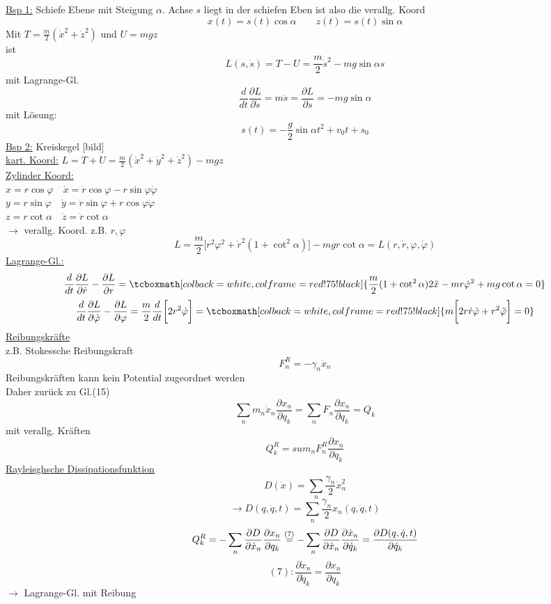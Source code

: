 \documentclass[titlepage,12pt,a4paper,ngerman]{report}
\newcommand{\rmbox}[1]{\tcboxmath[colback=white,colframe=red!75!black]{#1}} %
\renewcommand{\boxed}{\rmbox}
\begin{document}
\underline{Bsp 1:} Schiefe Ebene mit Steigung $ \alpha $. Achse $ s $ liegt in der schiefen Eben ist also die verallg. Koord
$$ x(t) = s(t) \cos \alpha \qquad z(t) = s(t) \sin \alpha$$
Mit $ T = \frac{m}{2} (\dot{x}^2 + \dot{z}^2) $ und $ U = mgz $\\
ist $$ L(s,\dot{s}) = T-U = \frac{m}{2} \dot{s}^2 - mg \sin \alpha s $$
mit Lagrange-Gl. 
$$\frac{d}{dt} \frac{\partial L}{\partial \dot{s}} = m \ddot{s} = \frac{\partial L}{\partial s} = - mg \sin \alpha$$
mit Lösung:
$$ s(t) = -\frac{g}{2} \sin \alpha t^2 + v_0 t + s_0 $$
\underline{Bsp 2:} Kreiskegel [bild]\\
\underline{kart. Koord:} $ L = T+U = \frac{m}{2} (\dot{x}^2 + \dot{y}^2 + \dot{z}^2) - mgz $\\
\underline{Zylinder Koord:}\\
$ x = r \cos \varphi \quad \dot{x} = \dot{r} \cos \varphi - r \sin \varphi \dot{\varphi} $ \\
$ y = r \sin \varphi \quad \dot{y} = \dot{r} \sin \varphi + r \cos \varphi \dot{\varphi} $\\
$z = r \cot \alpha \quad \dot{z} = \dot{r} \cot \alpha $\\
$ \rightarrow $ verallg. Koord. z.B. $ r,\varphi $\\
$$L = \frac{m}{2} \bigg[r^2 \varphi^2 + \dot{r}^2 ( 1 + \cot ^2 \alpha)\bigg] - mg r \cot \alpha = L(r,\dot{r}, \varphi , \dot{\varphi})$$
\underline{Lagrange-Gl.:}
$$\frac{d}{dt} \frac{\partial L}{\partial \dot{r}} - \frac{\partial L}{\partial r} = \boxed{\frac{m}{2} (1 + \cot^2 \alpha) 2 \ddot{x} - m r \dot{\varphi}^2 + m g \cot \alpha = 0}$$
$$ \frac{d}{dt} \frac{\partial L}{\partial \dot{\varphi}} - \frac{\partial L}{\partial \varphi} = \frac{m}{2} \frac{d}{dt} \bigg[2 r^2 \dot{\varphi}\bigg] = \boxed{m \bigg[2 r \dot{r} \dot{\varphi} + r^2 \ddot{\varphi}\bigg] = 0}$$
\underline{Reibungskräfte}\\
z.B. Stokessche Reibungskraft
$$F_n^R = - \gamma _n \dot{x}_n$$
Reibungskräften kann kein Potential zugeordnet werden\\
Daher zurück zu Gl.(15)
$$ \sum_n m_n \ddot{x}_n \frac{\partial x_n}{\partial q_k} = \sum_n F_n \frac{\partial x_n}{\partial q_k} = Q_k$$
mit verallg. Kräften 
$$ Q_k^R = sum_n F_n^R \frac{\partial x_n}{\partial q_k} $$
\underline{Rayleisghsche Dissipationsfunktion}
$$D(\dot{x}) = \sum_n \frac{\gamma _n}{2} \dot{x}^2_n$$
$$\rightarrow D(q, \dot{q}, t) = \sum_n \frac{\gamma_n}{2} x_n(q,\dot{q},t) $$
$$Q_k^R = - \sum_n \frac{\partial D}{\partial \dot{x}_n} \frac{\partial x_n}{\partial q_k} \buildrel (7) \over =  - \sum_n \frac{\partial D}{\partial \dot{x}_n} \frac{\partial \dot{x}_n}{\partial \dot{q}_k} = \frac{\partial D(q,\dot{q},t)}{\partial \dot{q}_k}$$
$$ (7) : \frac{\partial \dot{x}_n}{\partial \dot{q}_k} = \frac{\partial x_n}{\partial q_k}$$
$ \rightarrow  $ Lagrange-Gl. mit Reibung
\end{document}
